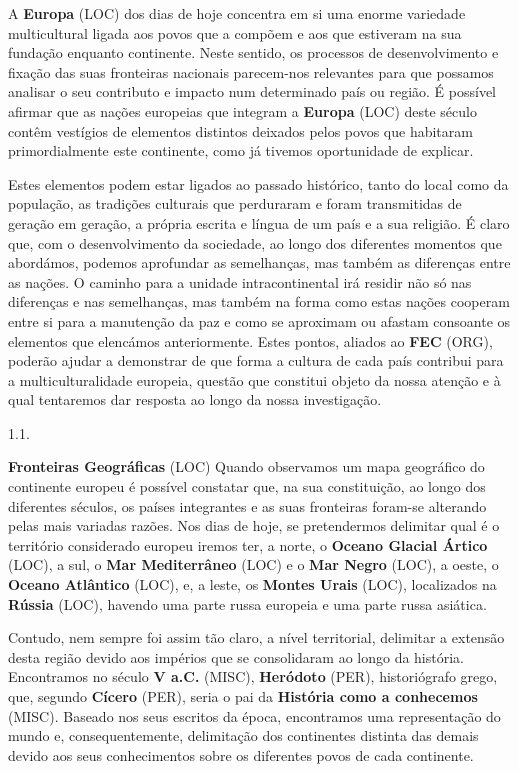 \documentclass[12pt,a4paper]{article}
\begin{document}
A \textbf{Europa} (LOC) dos dias de hoje concentra em si uma enorme variedade multicultural ligada  aos  povos  que  a  compõem  e  aos  que  estiveram  na  sua  fundação  enquanto continente. Neste sentido, os processos de desenvolvimento e fixação das suas fronteiras nacionais parecem-nos relevantes para que possamos analisar o seu contributo e impacto num determinado país ou região. É possível afirmar que as nações europeias que integram a \textbf{Europa} (LOC) deste século contêm vestígios de elementos distintos deixados pelos povos que habitaram primordialmente este continente, como já tivemos oportunidade de explicar.

Estes  elementos  podem  estar  ligados  ao  passado  histórico,  tanto  do  local  como  da população,  as  tradições  culturais  que  perduraram  e  foram  transmitidas  de  geração  em geração,  a  própria  escrita  e  língua  de  um  país  e  a  sua  religião.  É  claro  que,  com  o desenvolvimento  da  sociedade,  ao  longo  dos  diferentes  momentos  que  abordámos, podemos  aprofundar  as  semelhanças,  mas  também  as  diferenças  entre  as  nações.  O caminho  para  a  unidade  intracontinental  irá  residir  não  só  nas  diferenças  e  nas semelhanças,  mas  também  na  forma  como  estas  nações  cooperam  entre  si  para  a manutenção  da  paz  e  como  se  aproximam  ou  afastam  consoante  os  elementos  que elencámos anteriormente. Estes pontos, aliados ao \textbf{FEC} (ORG), poderão ajudar a demonstrar de que forma a cultura de cada país contribui para a multiculturalidade europeia, questão que constitui  objeto  da  nossa  atenção  e  à  qual  tentaremos  dar  resposta  ao  longo  da  nossa investigação.

1.1.

\textbf{Fronteiras Geográficas} (LOC) Quando  observamos  um  mapa  geográfico  do  continente  europeu  é  possível constatar que, na sua constituição, ao longo dos diferentes séculos, os países integrantes e as suas fronteiras foram-se alterando pelas mais variadas razões. Nos dias de hoje, se pretendermos  delimitar  qual  é  o  território  considerado  europeu  iremos  ter,  a  norte,  o \textbf{Oceano  Glacial  Ártico} (LOC),  a  sul,  o  \textbf{Mar  Mediterrâneo} (LOC)  e  o  \textbf{Mar  Negro} (LOC),  a  oeste,  o  \textbf{Oceano Atlântico} (LOC), e, a leste, os  \textbf{Montes Urais} (LOC),  localizados na \textbf{Rússia} (LOC), havendo uma parte russa europeia e uma parte russa asiática.

Contudo, nem sempre foi assim tão claro, a nível territorial, delimitar a extensão desta região devido aos impérios que se consolidaram ao longo da história. Encontramos no  século  \textbf{V  a.C.} (MISC),  \textbf{Heródoto} (PER),  historiógrafo  grego,  que,  segundo  \textbf{Cícero} (PER),  seria  o  pai  da \textbf{História  como  a  conhecemos} (MISC).  Baseado  nos  seus  escritos  da  época,  encontramos  uma representação do mundo e, consequentemente, delimitação dos continentes distinta das demais devido aos seus conhecimentos sobre os diferentes povos de cada continente.
\end{document}
